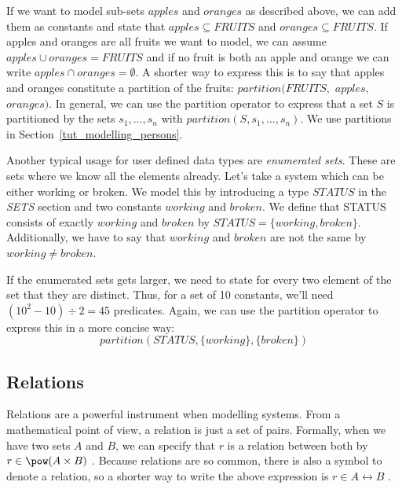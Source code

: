 
If we want to model sub-sets $apples$ and $oranges$ as described above, we can add them as
constants and state that $apples \subseteq FRUITS$ and $oranges \subseteq FRUITS$.
If apples and oranges are all fruits we want to model, we can assume $apples \cup oranges = FRUITS$
and if no fruit is both an apple and orange we can write $apples \cap oranges = \emptyset$.
A shorter way to express this is to say that apples and oranges constitute a
partition of the fruits: $partition(FRUITS,$ $apples,$ $oranges)$. %
In general, we can use the partition operator to express that a set $S$ is partitioned by the
sets $s_1,\ldots,s_n$ with $partition(S,s_1,\ldots,s_n)$.  We use partitions in Section~\ref{tut_modelling_persons}.

Another typical usage for user defined data types are \emph{enumerated sets}.
These are sets where we know all the elements already. Let's take a system which can be either working or broken.
We model this by introducing a type $STATUS$ in the \textsl{SETS} section and two constants
$working$ and $broken$.
We define that STATUS consists of exactly $working$ and $broken$ by $STATUS = \{working,broken\}$.
Additionally, we have to say that $working$ and $broken$ are not the same by $working \neq broken$.

If the enumerated sets gets larger, we need to state for every two element of the set that they are
distinct. Thus, for a set of 10 constants, we'll need $(10^2-10)\div 2 = 45$ predicates.
Again, we can use the partition operator to express this in a more concise way: 
\[partition(STATUS,\{working\},\{broken\})\]

\subsection{Relations}
\label{tut_relations}
Relations are a powerful instrument when modelling systems. From a mathematical point of view, a
relation is just a set of pairs. Formally, when we have two sets $A$ and $B$, we can specify that
$r$ is a relation between both by $r \in \pow(A\cprod B)$ .
Because relations are so common, there is also a symbol to denote a relation, so a shorter way to write the above expression is $r \in A\rel B$ .

